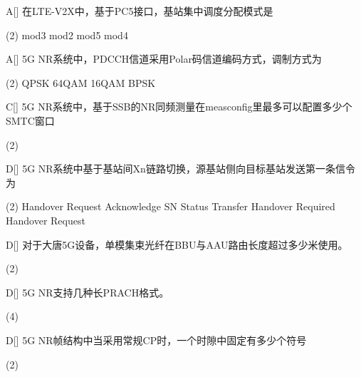 \begin{choice}{A}[]
    在LTE-V2X中，基于PC5接口，基站集中调度分配模式是
    \begin{tasks}(2)
        \task mod3
        \task mod2
        \task mod5
        \task mod4
    \end{tasks}
\end{choice}





\begin{choice}{A}[]
    5G NR系统中，PDCCH信道采用Polar码信道编码方式，调制方式为
    \begin{tasks}(2)
        \task QPSK
        \task 64QAM
        \task 16QAM
        \task BPSK
    \end{tasks}
\end{choice}


\begin{choice}{C}[]
    5G NR系统中，基于SSB的NR同频测量在measconfig里最多可以配置多少个SMTC窗口
    \begin{tasks}(2)
    \end{tasks}
\end{choice}

\begin{choice}{D}[]
    5G NR系统中基于基站间Xn链路切换，源基站侧向目标基站发送第一条信令为
    \begin{tasks}(2)
        \task Handover Request Acknowledge
        \task SN Status Transfer
        \task Handover Required
        \task Handover Request
    \end{tasks}
\end{choice}


\begin{choice}{D}[]
    对于大唐5G设备，单模集束光纤在BBU与AAU路由长度超过多少米使用。
    \begin{tasks}(2)
    \end{tasks}
\end{choice}


\begin{choice}{D}[]
    5G NR支持几种长PRACH格式。
    \begin{tasks}(4)
    \end{tasks}
\end{choice}


\begin{choice}{D}[]
    5G NR帧结构中当采用常规CP时，一个时隙中固定有多少个符号
    \begin{tasks}(2)
    \end{tasks}
\end{choice}


